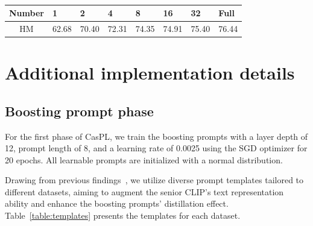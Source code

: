 \begin{table}[t]
    \centering
    \setlength{\tabcolsep}{10pt}
    \caption{}
    \resizebox{0.85\linewidth}{!}
    {
        \begin{tabular}{c|lllllll}
            \hline
            Number & 1     & 2     & 4     & 8     & 16    & 32    & Full                      \\
            \hline
            HM     & 62.68 & 70.40 & 72.31 & 74.35 & 74.91 & 75.40 & \multicolumn{1}{r}{76.44} \\
            \hline
        \end{tabular}
    }
    \label{table:boost-few-shot}
\end{table}

\section{Additional implementation details}
\subsection{Boosting prompt phase}
For the first phase of CasPL, we train the boosting prompts with a layer depth of 12, prompt length of 8, and a learning rate of 0.0025 using the SGD optimizer for 20 epochs. All learnable prompts are initialized with a normal distribution. 

Drawing from previous findings~\cite{khattak2023self}, we utilize diverse prompt templates tailored to different datasets, aiming to augment the senior CLIP's text representation ability and enhance the boosting prompts' distillation effect. Table~\ref{table:templates} presents the templates for each dataset.


